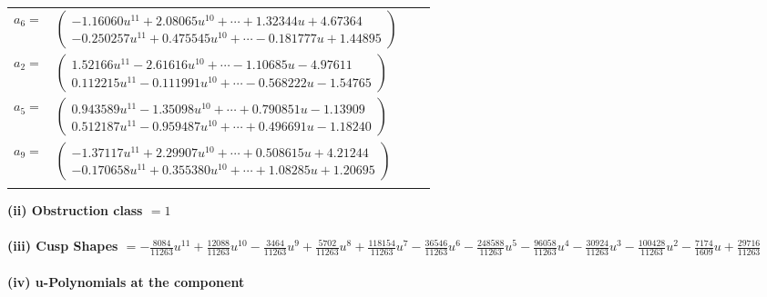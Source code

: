\documentclass[1p]{elsarticle_modified}
\theoremstyle{definition}
\begin{document}
\begin{tabular}{m{7pt} m{180pt} m{7pt} m{180pt} }
\flushright $a_{6}=$&$\begin{pmatrix}-1.16060 u^{11}+2.08065 u^{10}+\cdots+1.32344 u+4.67364\\-0.250257 u^{11}+0.475545 u^{10}+\cdots-0.181777 u+1.44895\end{pmatrix}$ \\
\flushright $a_{2}=$&$\begin{pmatrix}1.52166 u^{11}-2.61616 u^{10}+\cdots-1.10685 u-4.97611\\0.112215 u^{11}-0.111991 u^{10}+\cdots-0.568222 u-1.54765\end{pmatrix}$ \\
\flushright $a_{5}=$&$\begin{pmatrix}0.943589 u^{11}-1.35098 u^{10}+\cdots+0.790851 u-1.13909\\0.512187 u^{11}-0.959487 u^{10}+\cdots+0.496691 u-1.18240\end{pmatrix}$ \\
\flushright $a_{9}=$&$\begin{pmatrix}-1.37117 u^{11}+2.29907 u^{10}+\cdots+0.508615 u+4.21244\\-0.170658 u^{11}+0.355380 u^{10}+\cdots+1.08285 u+1.20695\end{pmatrix}$\\&\end{tabular}
\flushleft \textbf{(ii) Obstruction class $= 1$}\\~\\
\flushleft \textbf{(iii) Cusp Shapes $= -\frac{8084}{11263} u^{11}+\frac{12088}{11263} u^{10}-\frac{3464}{11263} u^9+\frac{5702}{11263} u^8+\frac{118154}{11263} u^7-\frac{36546}{11263} u^6-\frac{248588}{11263} u^5-\frac{96058}{11263} u^4-\frac{30924}{11263} u^3-\frac{100428}{11263} u^2-\frac{7174}{1609} u+\frac{29716}{11263}$}\\~\\
\newpage\renewcommand{\arraystretch}{1}
\flushleft \textbf{(iv) u-Polynomials at the component}\newline \\
\end{document}
